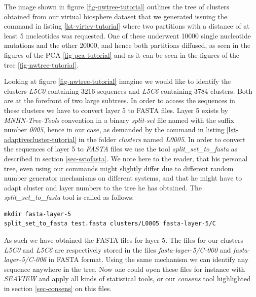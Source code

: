 The image shown in figure \ref{fig-nwtree-tutorial} outlines the tree
of clusters obtained from our
virtual biosphere dataset that we generated issuing the command in listing
\ref{lst-virtev-tutorial} where two partitions with a distance of at
least 5 nucleotides was requested. One of these underwent 10000 single
nucleotide mutations and the other 20000, and hence both partitions
diffused, as seen in the figures of the PCA \ref{fig-pca-tutorial} and as it
can be seen in the figures of the tree \ref{fig-nwtree-tutorial}.

Looking at figure \ref{fig-nwtree-tutorial}
imagine we would like to identify the clusters \emph{L5C0} containing
3216 sequences and \emph{L5C6} containing 3784 clusters. Both are at the
forefront of two large subtrees. In order to access the sequences in
these clusters we have to convert layer 5 to FASTA files. Layer 5
exists by \emph{MNHN-Tree-Tools} convention in a binary \emph{split-set}
file named with the suffix number \emph{0005}, hence in our case, as
demanded by the command in listing \ref{lst-adaptivecluster-tutorial}
in the folder \emph{clusters} named \emph{L0005}. In order to
convert the sequences of layer 5 to \emph{FASTA} files we use the
tool \emph{split\_set\_to\_fasta} as described in section
\ref{sec-sstofasta}. We note here to the reader, that his personal tree, even
using our commands might slightly differ due to different random
number generator mechanisms on different systems, and that he might
have to adapt cluster and layer numbers to the tree he has obtained. 
The \emph{split\_set\_to\_fasta} tool is called as follows:
\begin{lstlisting}
mkdir fasta-layer-5
split_set_to_fasta test.fasta clusters/L0005 fasta-layer-5/C
\end{lstlisting}
As such we have obtained the FASTA files for layer 5. The files for our
clusters \emph{L5C0} and \emph{L5C6} are respectively stored in the
files \emph{fasta-layer-5/C-000} and \emph{fasta-layer-5/C-006} in
FASTA format. Using the same mechanism we can identify any sequence
anywhere in the tree. Now one could open these files for instance with
\emph{SEAVIEW} and apply all kinds of statistical tools, or our
\emph{consens} tool highlighted in section \ref{sec-consens} on this
files.

